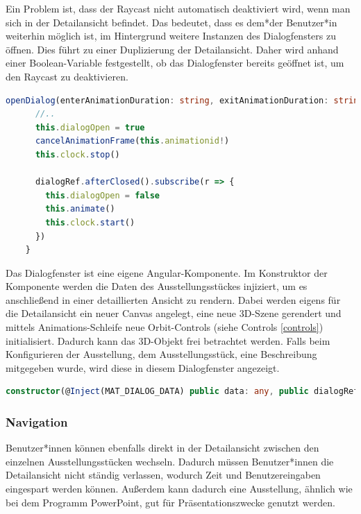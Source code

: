 Ein Problem ist, dass der Raycast nicht automatisch deaktiviert wird, wenn man sich in der Detailansicht befindet. Das bedeutet, dass es dem*der Benutzer*in weiterhin möglich ist, im Hintergrund weitere Instanzen des Dialogfensters zu öffnen. Dies führt zu einer Duplizierung der Detailansicht. Daher wird anhand einer Boolean-Variable festgestellt, ob das Dialogfenster bereits geöffnet ist, um den Raycast zu deaktivieren. 

\begin{lstlisting}[caption={Öffnen und Schließen des Dialogfensters},language=TypeScript]
  openDialog(enterAnimationDuration: string, exitAnimationDuration: string): void {
      //..
      this.dialogOpen = true
      cancelAnimationFrame(this.animationid!)
      this.clock.stop()
  
      dialogRef.afterClosed().subscribe(r => {
        this.dialogOpen = false
        this.animate()
        this.clock.start()
      })
    }
\end{lstlisting}

Das Dialogfenster ist eine eigene Angular-Komponente. Im Konstruktor der Komponente werden die Daten des Ausstellungsstückes injiziert, um es anschließend in einer detaillierten Ansicht zu rendern. Dabei werden eigens für die Detailansicht ein neuer Canvas angelegt, eine neue 3D-Szene gerendert und mittels Animations-Schleife neue Orbit-Controls (siehe Controls \ref{controls}) initialisiert. Dadurch kann das 3D-Objekt frei betrachtet werden. Falls beim Konfigurieren der Ausstellung, dem Ausstellungsstück, eine Beschreibung mitgegeben wurde, wird diese in diesem Dialogfenster angezeigt.

  \begin{lstlisting}[caption={Constructor-Injection in der Dialog Komponente},language=TypeScript]
    constructor(@Inject(MAT_DIALOG_DATA) public data: any, public dialogRef: MatDialogRef<ExhibitDialog>) {}

  \end{lstlisting}

\subsubsection{Navigation}
Benutzer*innen können ebenfalls direkt in der Detailansicht zwischen den einzelnen Ausstellungsstücken wechseln. Dadurch müssen Benutzer*innen die Detailansicht nicht ständig verlassen, wodurch Zeit und Benutzereingaben eingespart werden können. Außerdem kann dadurch eine Ausstellung, ähnlich wie bei dem Programm PowerPoint, gut für Präsentationszwecke genutzt werden.  

